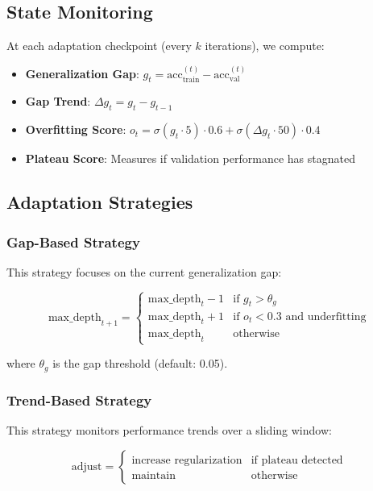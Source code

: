 \documentclass[conference]{IEEEtran}
\begin{document}
\subsection{State Monitoring}

At each adaptation checkpoint (every $k$ iterations), we compute:

\begin{itemize}
    \item \textbf{Generalization Gap}: $g_t = \text{acc}_{\text{train}}^{(t)} - \text{acc}_{\text{val}}^{(t)}$
    \item \textbf{Gap Trend}: $\Delta g_t = g_t - g_{t-1}$
    \item \textbf{Overfitting Score}: $o_t = \sigma(g_t \cdot 5) \cdot 0.6 + \sigma(\Delta g_t \cdot 50) \cdot 0.4$
    \item \textbf{Plateau Score}:  Measures if validation performance has stagnated
\end{itemize}

\subsection{Adaptation Strategies}

\subsubsection{Gap-Based Strategy}

This strategy focuses on the current generalization gap: 

\begin{equation}
\text{max\_depth}_{t+1} = 
\begin{cases}
\text{max\_depth}_t - 1 & \text{if } g_t > \theta_g \\
\text{max\_depth}_t + 1 & \text{if } o_t < 0.3 \text{ and underfitting} \\
\text{max\_depth}_t & \text{otherwise}
\end{cases}
\end{equation}

where $\theta_g$ is the gap threshold (default:  0.05).

\subsubsection{Trend-Based Strategy}

This strategy monitors performance trends over a sliding window:

\begin{equation}
\text{adjust} = 
\begin{cases}
\text{increase regularization} & \text{if plateau detected} \\
\text{maintain} & \text{otherwise}
\end{cases}
\end{equation}
\end{document}
